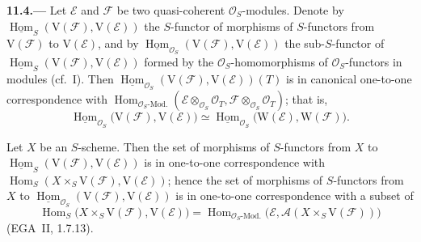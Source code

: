
\medskip
{}\label{par:sga3-VIB-11.4}%
\noindent\textbf{11.4.---}
Let \(\mathcal E\) and \(\mathcal F\) be two quasi-coherent
\(\mathcal O_S\)-modules. Denote by
\(\underline{\operatorname{Hom}}_S(\mathrm V(\mathcal F),\mathrm V(\mathcal E))\)
the \(S\)-functor of morphisms of \(S\)-functors from
\(\mathrm V(\mathcal F)\) to \(\mathrm V(\mathcal E)\), and by
\(\underline{\operatorname{Hom}}_{\mathcal O_S}(\mathrm V(\mathcal F),\mathrm V(\mathcal E))\)
the sub-\(S\)-functor of
\(\underline{\operatorname{Hom}}_S(\mathrm V(\mathcal F),\mathrm V(\mathcal E))\)
formed by the \(\mathcal O_S\)-homomorphisms of
\(\mathcal O_S\)-functors in modules \textup{(cf.\ I)}. Then
\(\underline{\operatorname{Hom}}_{\mathcal O_S}(\mathrm V(\mathcal F),\mathrm V(\mathcal E))(T)\)
is in canonical one-to-one correspondence with
\(\operatorname{Hom}_{\mathcal O_S\text{-Mod.}}
(\mathcal E\otimes_{\mathcal O_S}\mathcal O_T,\mathcal F\otimes_{\mathcal O_S}\mathcal O_T)\);
that is,
\[
  \underline{\operatorname{Hom}}_{\mathcal O_S}
    \bigl(\mathrm V(\mathcal F),\mathrm V(\mathcal E)\bigr)
  \simeq
  \underline{\operatorname{Hom}}_{\mathcal O_S}
    \bigl(\mathrm W(\mathcal E),\mathrm W(\mathcal F)\bigr).
\]

Let \(X\) be an \(S\)-scheme. Then the set of morphisms of
\(S\)-functors from \(X\) to
\(\underline{\operatorname{Hom}}_S(\mathrm V(\mathcal F),\mathrm V(\mathcal E))\)
is in one-to-one correspondence with
\(\operatorname{Hom}_S(X\times_S\mathrm V(\mathcal F),\mathrm V(\mathcal E))\);
hence the set of morphisms of \(S\)-functors from \(X\) to
\(\underline{\operatorname{Hom}}_{\mathcal O_S}(\mathrm V(\mathcal F),\mathrm V(\mathcal E))\)
is in one-to-one correspondence with a subset of
\[
  \operatorname{Hom}_S\bigl(X\times_S\mathrm V(\mathcal F),\mathrm V(\mathcal E)\bigr)
  =\operatorname{Hom}_{\mathcal O_S\text{-Mod.}}
    \bigl(\mathcal E,\mathcal A(X\times_S\mathrm V(\mathcal F))\bigr)
\]
\textup{(EGA~II, 1.7.13)}.

